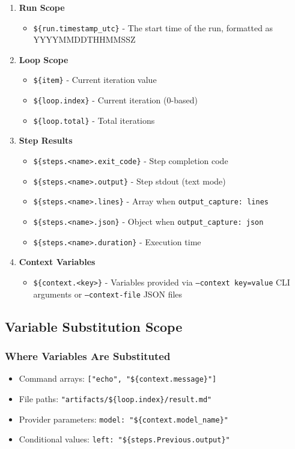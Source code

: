 \documentclass[11pt,a4paper]{article}
\begin{document}
\begin{enumerate}
    \item \textbf{Run Scope}
    \begin{itemize}
        \item \texttt{\$\{run.timestamp\_utc\}} - The start time of the run, formatted as YYYYMMDDTHHMMSSZ
    \end{itemize}
    
    \item \textbf{Loop Scope}
    \begin{itemize}
        \item \texttt{\$\{item\}} - Current iteration value
        \item \texttt{\$\{loop.index\}} - Current iteration (0-based)
        \item \texttt{\$\{loop.total\}} - Total iterations
    \end{itemize}
    
    \item \textbf{Step Results}
    \begin{itemize}
        \item \texttt{\$\{steps.<name>.exit\_code\}} - Step completion code
        \item \texttt{\$\{steps.<name>.output\}} - Step stdout (text mode)
        \item \texttt{\$\{steps.<name>.lines\}} - Array when \texttt{output\_capture: lines}
        \item \texttt{\$\{steps.<name>.json\}} - Object when \texttt{output\_capture: json}
        \item \texttt{\$\{steps.<name>.duration\}} - Execution time
    \end{itemize}
    
    \item \textbf{Context Variables}
    \begin{itemize}
        \item \texttt{\$\{context.<key>\}} - Variables provided via \texttt{--context key=value} CLI arguments or \texttt{--context-file} JSON files
    \end{itemize}
\end{enumerate}

\subsection{Variable Substitution Scope}

\subsubsection{Where Variables Are Substituted}
\begin{itemize}
    \item Command arrays: \texttt{["echo", "\$\{context.message\}"]}
    \item File paths: \texttt{"artifacts/\$\{loop.index\}/result.md"}
    \item Provider parameters: \texttt{model: "\$\{context.model\_name\}"}
    \item Conditional values: \texttt{left: "\$\{steps.Previous.output\}"}
\end{itemize}
\end{document}
